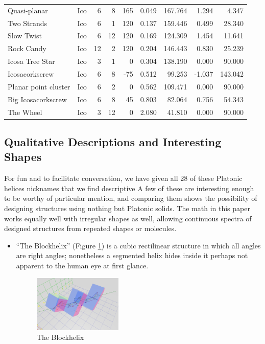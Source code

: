 \documentclass[11pt]{article}
\begin{document}
{\begin{table}[ht]
\begin{tabular}{l l r r r r r r r}
Quasi-planar & Ico &	6 &	8 &	165 &	0.049 &	167.764 & 1.294 & 4.347 \\
Two Strands & Ico &	6 &	1 &	120 &	0.137 &	159.446	& 0.499 & 28.340 \\
Slow Twist & Ico &	6 &	12 &	120 &	0.169 &	124.309	& 1.454	& 11.641 \\
Rock Candy & Ico &	12 &	2 &	120 &	0.204 &	146.443	& 0.830 & 25.239 \\
Icosa Tree Star & Ico &	3 &	1 &	0 &	0.304 &	138.190	& 0.000	& 90.000 \\
Icosacorkscrew & Ico &	6 &	8 &	-75 &	0.512 &	99.253	& -1.037 & 143.042 \\
Planar point cluster & Ico &	6 &	2 &	0 &	0.562 &	109.471 & 0.000 & 90.000 \\
Big Icosacorkscrew  & Ico &	6 &	8 &	45 &	0.803 &	82.064 & 0.756 & 54.343 \\
The Wheel & Ico &	3 &	12 &	0 &	2.080 &	41.810 & 0.000 & 90.000 \\
\hline %
\end{tabular}
\label{table:platonic} %
\end{table}

\subsection{Qualitative Descriptions and Interesting Shapes}

For fun and to facilitate conversation, we have given all
28 of these Platonic helices nicknames that we find descriptive
A few of these are interesting enough
to be worthy of particular mention, and comparing them
shows the possibility of designing structures using nothing but Platonic solids.
The math in this paper works equally well with irregular shapes as well,
allowing continuous spectra of designed structures from repeated shapes
or molecules.

\begin{itemize}
\item ``The Blockhelix'' (Figure \ref{fig:blockhelix}) is a cubic rectilinear structure in which all angles are right angles; nonetheless
  a segmented helix hides inside it perhaps not apparent to the human eye at first glance.
\begin{figure}
     \centering
     \includegraphics[width=0.40\textwidth]{figures/Blockhelix.png}
     \caption{The Blockhelix}
  \label{fig:blockhelix}
\end{figure}


\end{itemize}}
\end{document}
